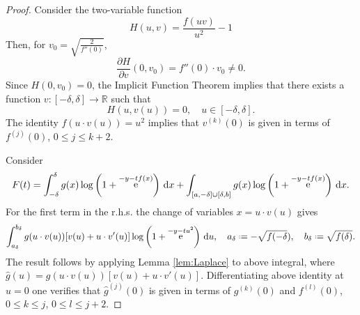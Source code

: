\documentclass[reqno,a4paper,11pt]{amsart}
\DeclareMathOperator{\ee}{\rm e}
\newcommand{\R}{\mathbb{R}}
\newcommand{\dd}{\mathrm{d}}
\theoremstyle{definition}
\theoremstyle{remark}
\numberwithin{equation}{section}
\newcommand*{\defeq}{\mathrel{\vcenter{\baselineskip0.5ex \lineskiplimit0pt
                     \hbox{\scriptsize.}\hbox{\scriptsize.}}}%
                     =}
\begin{document}
\begin{proof}
    Consider the two-variable function
    \[
        H(u,v) = \frac{f(uv)}{u^2} - 1 
    \]
    Then, for $v_0 = \sqrt{\frac{2}{f''(0)}}$,
    \[
        \frac{\partial H}{\partial v} (0,v_0) = f''(0) \cdot v_0 \neq 0.
    \]
    Since $H(0,v_0) = 0$, the Implicit Function Theorem implies that there exists a function $v:[-\delta,\delta] \to \R$ such that 
    \[
        H(u,v(u)) = 0, \quad u \in [-\delta,\delta].
    \]
    The identity $f(u \cdot v(u)) = u^2$ implies that $v^{(k)}(0)$ is given in terms of $f^{(j)}(0)$, $0 \leq j \leq k+2$.

    Consider
    \[
        F(t) = \int_{-\delta}^{\delta} g(x) \log\left( 1+\ee^{-y-tf(x)} \right) \, \dd x + \int_{[a,-\delta] \cup [\delta, b]}  g(x) \log \left(1+\ee^{-y-t f(x)} \right)\, \dd x.
    \]
    For the first term in the r.h.s. the change of variables $x = u \cdot v(u)$ gives
    \[
        \int_{a_\delta}^{b_\delta} g(u \cdot v(u)) [v(u) + u \cdot v'(u)] \log \left( 1 + \ee^{- y - t u^2} \right) \, \dd u, \quad 
        a_\delta \defeq - \sqrt{f(-\delta}), \quad 
        b_\delta \defeq \sqrt{f(\delta)}.
    \]
    The result follows by applying Lemma \ref{lem:Laplace} to above integral, where $\widehat{g}(u) = g(u \cdot v(u))[ v(u) + u \cdot v'(u)]$. Differentiating above identity at $u=0$ one verifies that  $\widehat{g}^{(j)}(0)$ is given in terms of $g^{(k)}(0)$ and $f^{(l)}(0)$, $0 \leq k \leq j$, $0 \leq l \leq j+2$.
\end{proof}

  

\end{document}
